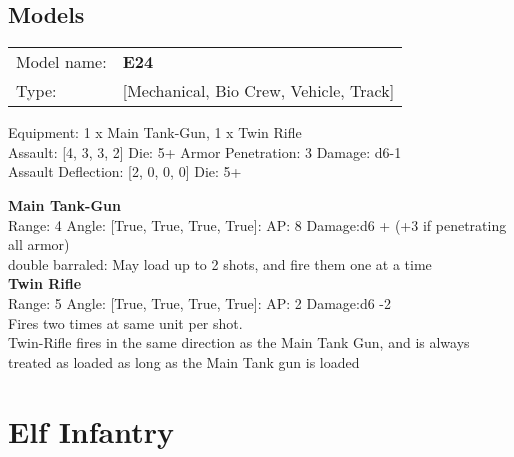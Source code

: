\pagebreak

\subsection{ Models }

\begin{tabular}{ll}
Model name: & {\bf E24 } \\
Type: & [Mechanical, Bio Crew, Vehicle, Track] \\
\end{tabular}

Equipment: 1 x Main Tank-Gun, 1 x Twin Rifle \\

Assault: [4, 3, 3, 2] Die: 5+ Armor Penetration: 3 Damage: d6-1 \\
Assault Deflection: [2, 0, 0, 0] Die: 5+\\
\indent  



{\bf Main Tank-Gun } \\



Range: 4  Angle: [True, True, True, True]: AP: 8 Damage:d6 + (+3 if penetrating all armor) \\
double barraled: May load up to 2 shots, and fire them one at a time\\ 




{\bf Twin Rifle } \\



Range: 5  Angle: [True, True, True, True]: AP: 2 Damage:d6 -2 \\
Fires two times at same unit per shot.\\Twin-Rifle fires in the same direction as the Main Tank Gun, and is always treated as loaded as long as the Main Tank gun is loaded\\ 




 















\pagebreak\pagebreak

\section{ Elf Infantry }


